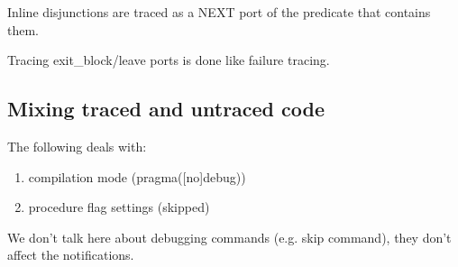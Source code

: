 Inline disjunctions are traced as a NEXT port of the predicate that
contains them.

Tracing exit_block/leave ports is done like failure tracing.


\subsection{Mixing traced and untraced code}

The following deals with:
\begin{enumerate}
\item compilation mode (pragma([no]debug))
\item procedure flag settings (skipped)
\end{enumerate}
We don't talk here about debugging commands (e.g. skip command),
they don't affect the notifications.

% 
% 
% 
% 
% 
% 
% 
% 

